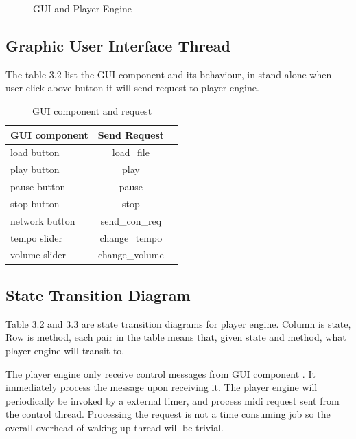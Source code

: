 \begin{figure}[H]
\caption{GUI and Player Engine}
\label{fig:speciation}
\end{figure}

\subsection{Graphic User Interface Thread}

The table 3.2 list the GUI component and its behaviour, in stand-alone 
when user click above button it will send request to player engine.
\begin{table}[htdp]
\centering
\begin{tabular}{|l||*{2}{c|}}\hline
GUI component & Send Request \\ \hline
load button & load\_file \\\hline
play button & play\\\hline
pause button & pause \\\hline
stop button & stop \\\hline
network button & send\_con\_req \\\hline
tempo slider & change\_tempo \\\hline
volume slider & change\_volume \\\hline
\end{tabular}

\caption[GUI component and request]{GUI component and request}
\label{latexin_genes}
\end{table}

\subsection{State Transition Diagram}

Table 3.2 and 3.3 are state transition diagrams for player engine. Column is state, 
Row is method,  each pair in the table means that, given state and method, 
what player engine will transit to.

The player engine only receive control messages from GUI component . 
It immediately process the message upon receiving it. The player engine 
will periodically be invoked by 
a external timer, and process midi request sent from the control thread. 
Processing the request is not a time consuming job so the overall overhead 
of waking up thread will be trivial. 

